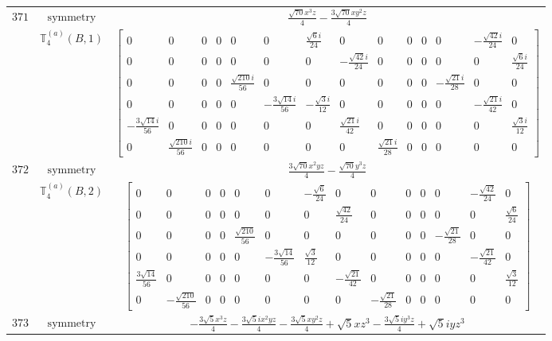 \documentclass[fleqn,8pt,landscape]{jsarticle}
\begin{document}
\begin{longtable}{ccc}
$ 371 $ & $ \text{symmetry} $ & $ \frac{\sqrt{70} x^{3} z}{4} - \frac{3 \sqrt{70} x y^{2} z}{4} $ \\
$  $ & $ \mathbb{T}_{4}^{(a)}(B,1) $ & $ \begin{bmatrix} 0 & 0 & 0 & 0 & 0 & 0 & \frac{\sqrt{6} i}{24} & 0 & 0 & 0 & 0 & 0 & - \frac{\sqrt{42} i}{24} & 0 \\ 0 & 0 & 0 & 0 & 0 & 0 & 0 & - \frac{\sqrt{42} i}{24} & 0 & 0 & 0 & 0 & 0 & \frac{\sqrt{6} i}{24} \\ 0 & 0 & 0 & 0 & \frac{\sqrt{210} i}{56} & 0 & 0 & 0 & 0 & 0 & 0 & - \frac{\sqrt{21} i}{28} & 0 & 0 \\ 0 & 0 & 0 & 0 & 0 & - \frac{3 \sqrt{14} i}{56} & - \frac{\sqrt{3} i}{12} & 0 & 0 & 0 & 0 & 0 & - \frac{\sqrt{21} i}{42} & 0 \\ - \frac{3 \sqrt{14} i}{56} & 0 & 0 & 0 & 0 & 0 & 0 & \frac{\sqrt{21} i}{42} & 0 & 0 & 0 & 0 & 0 & \frac{\sqrt{3} i}{12} \\ 0 & \frac{\sqrt{210} i}{56} & 0 & 0 & 0 & 0 & 0 & 0 & \frac{\sqrt{21} i}{28} & 0 & 0 & 0 & 0 & 0 \end{bmatrix} $ \\ \hline
$ 372 $ & $ \text{symmetry} $ & $ \frac{3 \sqrt{70} x^{2} y z}{4} - \frac{\sqrt{70} y^{3} z}{4} $ \\
$  $ & $ \mathbb{T}_{4}^{(a)}(B,2) $ & $ \begin{bmatrix} 0 & 0 & 0 & 0 & 0 & 0 & - \frac{\sqrt{6}}{24} & 0 & 0 & 0 & 0 & 0 & - \frac{\sqrt{42}}{24} & 0 \\ 0 & 0 & 0 & 0 & 0 & 0 & 0 & \frac{\sqrt{42}}{24} & 0 & 0 & 0 & 0 & 0 & \frac{\sqrt{6}}{24} \\ 0 & 0 & 0 & 0 & \frac{\sqrt{210}}{56} & 0 & 0 & 0 & 0 & 0 & 0 & - \frac{\sqrt{21}}{28} & 0 & 0 \\ 0 & 0 & 0 & 0 & 0 & - \frac{3 \sqrt{14}}{56} & \frac{\sqrt{3}}{12} & 0 & 0 & 0 & 0 & 0 & - \frac{\sqrt{21}}{42} & 0 \\ \frac{3 \sqrt{14}}{56} & 0 & 0 & 0 & 0 & 0 & 0 & - \frac{\sqrt{21}}{42} & 0 & 0 & 0 & 0 & 0 & \frac{\sqrt{3}}{12} \\ 0 & - \frac{\sqrt{210}}{56} & 0 & 0 & 0 & 0 & 0 & 0 & - \frac{\sqrt{21}}{28} & 0 & 0 & 0 & 0 & 0 \end{bmatrix} $ \\ \hline
$ 373 $ & $ \text{symmetry} $ & $ - \frac{3 \sqrt{5} x^{3} z}{4} - \frac{3 \sqrt{5} i x^{2} y z}{4} - \frac{3 \sqrt{5} x y^{2} z}{4} + \sqrt{5} x z^{3} - \frac{3 \sqrt{5} i y^{3} z}{4} + \sqrt{5} i y z^{3} $ \\

\end{longtable}
\end{document}
